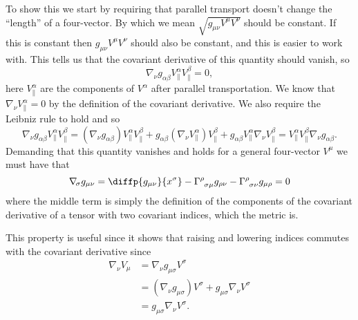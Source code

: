 \documentclass[fleqn]{NotesClass}
\newcommand*{\christoffel}[3]{\tensor{\Gamma}{^{#1}_{{#2}{#3}}}}
\newcommand*{\covariantDerivative}[1]{\nabla_{\!#1}}
\begin{document}
    To show this we start by requiring that parallel transport doesn't change the \enquote{length} of a four-vector.
    By which we mean \(\sqrt{g_{\mu\nu}V^\mu V^\nu}\) should be constant.
    If this is constant then \(g_{\mu\nu}V^\mu V^\nu\) should also be constant, and this is easier to work with.
    This tells us that the covariant derivative of this quantity should vanish, so
    \begin{equation}
        \covariantDerivative{\nu} g_{\alpha\beta} V^\alpha_{\|} V^\beta_{\|} = 0,
    \end{equation}
    here \(V^\alpha_{\|}\) are the components of \(V^\alpha\) after parallel transportation.
    We know that \(\covariantDerivative{\nu}V^\alpha_{\|} = 0\) by the definition of the covariant derivative.
    We also require the Leibniz rule to hold and so
    \begin{equation}
        \covariantDerivative{\nu} g_{\alpha\beta} V^\alpha_{\|}V^\beta_{\|} = (\covariantDerivative{\nu}g_{\alpha\beta}) V^\alpha_{\|}V^\beta_{\|} + g_{\alpha\beta}(\covariantDerivative{\nu}V^\alpha_{\|})V^\beta_{\|} + g_{\alpha\beta}V^\alpha_{\|}\covariantDerivative{\nu}V^\beta_{\|} = V^\alpha_{\|}V^\beta_{\|}\covariantDerivative{\nu}g_{\alpha\beta}.
    \end{equation}
    Demanding that this quantity vanishes and holds for a general four-vector \(V^\mu\) we must have that
    \begin{equation}
        \covariantDerivative{\sigma}g_{\mu\nu} = \diffp{g_{\mu\nu}}{x^\sigma}  - \christoffel{\rho}{\sigma}{\mu} g_{\rho\nu} - \christoffel{\rho}{\sigma}{\nu} g_{\mu\rho} = 0
    \end{equation}
    where the middle term is simply the definition of the components of the covariant derivative of a tensor with two covariant indices, which the metric is.
    
    This property is useful since it shows that raising and lowering indices commutes with the covariant derivative since
    \begin{align}
        \covariantDerivative{\nu} V_\mu &= \covariantDerivative{\nu} g_{\mu\sigma}V^\sigma\\
        &= (\covariantDerivative{\nu} g_{\mu\sigma}) V^\sigma + g_{\mu\sigma} \covariantDerivative{\nu} V^\sigma\\
        &= g_{\mu\sigma} \covariantDerivative{\nu} V^\sigma.
    \end{align}
    
\end{document}
